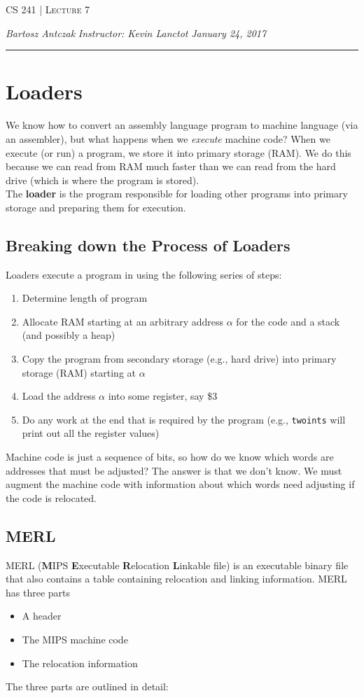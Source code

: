 \documentclass{report}
\newcommand{\lectureNum}{7}
\newcommand{\curDate}{January 24, 2017}
\newcommand{\course}{CS 241}
\newcommand{\instructor}{Kevin Lanctot}
\begin{document}
\begin{center}
\begin{Large}
\textsc{\course{} | Lecture \lectureNum{}}
\end{Large}
\end{center} 
\noindent \textit{Bartosz Antczak} \hfill
\textit{Instructor: \instructor{}} \hfill
\textit{\curDate{}}
\rule{\textwidth}{0.4pt}
\section{Loaders}
We know how to convert an assembly language program to machine language (via an assembler), but what happens when we \textit{execute} machine code? When we execute (or run) a program, we store it into primary storage (RAM). We do this because we can read from RAM much faster than we can read from the hard drive (which is where the program is stored).\\
The \textbf{loader} is the program responsible for loading other programs into primary storage and preparing them for execution.
\subsection{Breaking down the Process of Loaders}
Loaders execute a program in using the following series of steps:
\begin{enumerate}
\item Determine length of program
\item Allocate RAM starting at an arbitrary address $\alpha$ for the code and a stack (and possibly a heap)
\item Copy the program from secondary storage (e.g., hard drive) into primary storage (RAM) starting at $\alpha$
\item Load the address $\alpha$ into some register, say \$3
\item Do any work at the end that is required by the program (e.g., \texttt{twoints} will print out all the register values)
\end{enumerate}
Machine code is just a sequence of bits, so how do we know which words are addresses that must be adjusted? The answer is that we don't know. We must augment the machine code with information about which words need adjusting if the code is relocated.
\subsection{MERL}
MERL (\textbf{M}IPS \textbf{E}xecutable \textbf{R}elocation \textbf{L}inkable file) is an executable binary file that also contains a table containing relocation and linking information. MERL has three parts
\begin{itemize}
\item A header
\item The MIPS machine code
\item The relocation information
\end{itemize}
The three parts are outlined in detail:
\end{document}
